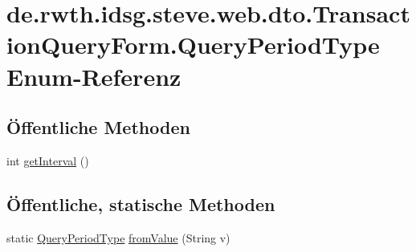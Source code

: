 \hypertarget{enumde_1_1rwth_1_1idsg_1_1steve_1_1web_1_1dto_1_1_transaction_query_form_1_1_query_period_type}{\section{de.\-rwth.\-idsg.\-steve.\-web.\-dto.\-Transaction\-Query\-Form.\-Query\-Period\-Type Enum-\/\-Referenz}
\label{enumde_1_1rwth_1_1idsg_1_1steve_1_1web_1_1dto_1_1_transaction_query_form_1_1_query_period_type}
}
\subsection*{Öffentliche Methoden}
\begin{DoxyCompactItemize}
\item 
int \hyperlink{enumde_1_1rwth_1_1idsg_1_1steve_1_1web_1_1dto_1_1_transaction_query_form_1_1_query_period_type_ae496b7694a8443e109d5a82a9ba4d6eb}{get\-Interval} ()
\end{DoxyCompactItemize}
\subsection*{Öffentliche, statische Methoden}
\begin{DoxyCompactItemize}
\item 
static \hyperlink{enumde_1_1rwth_1_1idsg_1_1steve_1_1web_1_1dto_1_1_transaction_query_form_1_1_query_period_type}{Query\-Period\-Type} \hyperlink{enumde_1_1rwth_1_1idsg_1_1steve_1_1web_1_1dto_1_1_transaction_query_form_1_1_query_period_type_a2f9a56079713dc07bb3d4f9150f4a844}{from\-Value} (String v)
\end{DoxyCompactItemize}
